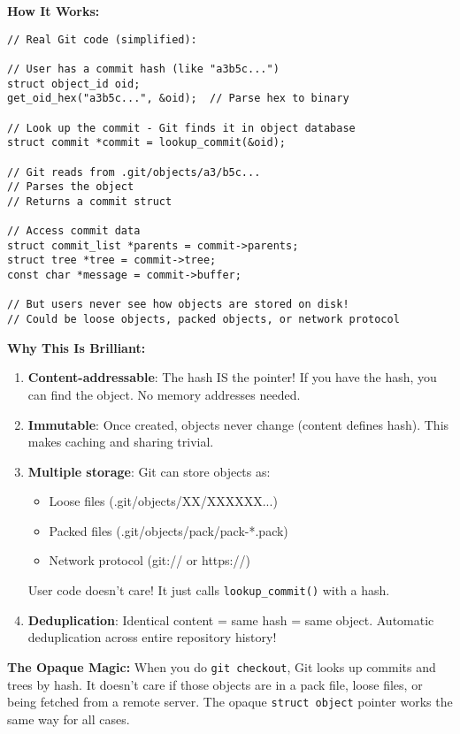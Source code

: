 \textbf{How It Works:}

\begin{lstlisting}
// Real Git code (simplified):

// User has a commit hash (like "a3b5c...")
struct object_id oid;
get_oid_hex("a3b5c...", &oid);  // Parse hex to binary

// Look up the commit - Git finds it in object database
struct commit *commit = lookup_commit(&oid);

// Git reads from .git/objects/a3/b5c...
// Parses the object
// Returns a commit struct

// Access commit data
struct commit_list *parents = commit->parents;
struct tree *tree = commit->tree;
const char *message = commit->buffer;

// But users never see how objects are stored on disk!
// Could be loose objects, packed objects, or network protocol
\end{lstlisting}

\textbf{Why This Is Brilliant:}

\begin{enumerate}
    \item \textbf{Content-addressable}: The hash IS the pointer! If you have the hash, you can find the object. No memory addresses needed.

    \item \textbf{Immutable}: Once created, objects never change (content defines hash). This makes caching and sharing trivial.

    \item \textbf{Multiple storage}: Git can store objects as:
    \begin{itemize}
        \item Loose files (.git/objects/XX/XXXXXX...)
        \item Packed files (.git/objects/pack/pack-*.pack)
        \item Network protocol (git:// or https://)
    \end{itemize}
    User code doesn't care! It just calls \texttt{lookup\_commit()} with a hash.

    \item \textbf{Deduplication}: Identical content = same hash = same object. Automatic deduplication across entire repository history!
\end{enumerate}

\textbf{The Opaque Magic:} When you do \texttt{git checkout}, Git looks up commits and trees by hash. It doesn't care if those objects are in a pack file, loose files, or being fetched from a remote server. The opaque \texttt{struct object} pointer works the same way for all cases.

